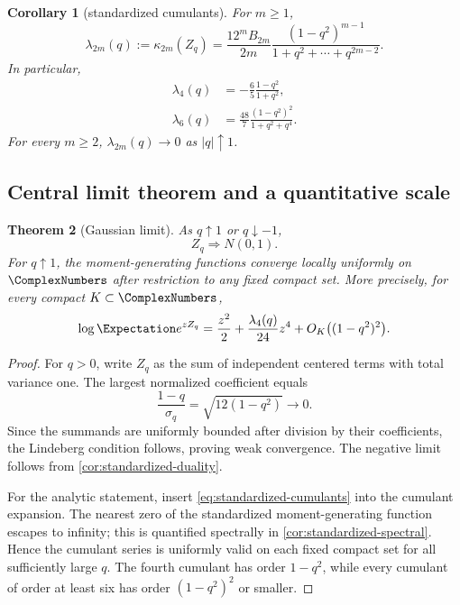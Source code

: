 \documentclass[11pt]{article}
\newtheorem{theorem}{Theorem}[section]
\newtheorem{corollary}[theorem]{Corollary}
\theoremstyle{definition}
\theoremstyle{remark}
\begin{document}
\begin{corollary}[standardized cumulants]\label{cor:standardized-cumulants}
For $m\ge1$,
\begin{equation}\label{eq:standardized-cumulants}
 \lambda_{2m}(q):=\kappa_{2m}(Z_q)
 =\frac{12^mB_{2m}}{2m}
 \frac{(1-q^2)^{m-1}}{1+q^2+\cdots+q^{2m-2}}.
\end{equation}
In particular,
\begin{align}
 \lambda_4(q)&=-\frac65\frac{1-q^2}{1+q^2},\label{eq:lambda4}\\
 \lambda_6(q)&=\frac{48}{7}\frac{(1-q^2)^2}{1+q^2+q^4}.
 \label{eq:lambda6}
\end{align}
For every $m\ge2$, $\lambda_{2m}(q)\to0$ as $|q|\uparrow1$.
\end{corollary}

\subsection{Central limit theorem and a quantitative scale}

\begin{theorem}[Gaussian limit]\label{thm:clt}
As $q\uparrow1$ or $q\downarrow-1$,
\[
 Z_q\Longrightarrow N(0,1).
\]
For $q\uparrow1$, the moment-generating functions converge locally uniformly on $\ComplexNumbers$ after restriction to any fixed compact set.  More precisely, for every compact $K\subset\ComplexNumbers$,
\begin{equation}\label{eq:analytic-gaussian}
 \log\Expectation e^{zZ_q}
 =\frac{z^2}{2}+\frac{\lambda_4(q)}{24}z^4
 +O_K\bigl((1-q^2)^2\bigr).
\end{equation}
\end{theorem}

\begin{proof}
For $q>0$, write $Z_q$ as the sum of independent centered terms with total variance one.  The largest normalized coefficient equals
\[
 \frac{1-q}{\sigma_q}=\sqrt{12(1-q^2)}\longrightarrow0.
\]
Since the summands are uniformly bounded after division by their coefficients, the Lindeberg condition follows, proving weak convergence.  The negative limit follows from \cref{cor:standardized-duality}.

For the analytic statement, insert \cref{eq:standardized-cumulants} into the cumulant expansion.  The nearest zero of the standardized moment-generating function escapes to infinity; this is quantified spectrally in \cref{cor:standardized-spectral}.  Hence the cumulant series is uniformly valid on each fixed compact set for all sufficiently large $q$.  The fourth cumulant has order $1-q^2$, while every cumulant of order at least six has order $(1-q^2)^2$ or smaller.
\end{proof}
\end{document}
